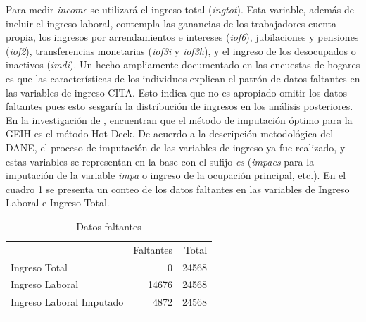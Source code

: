 \documentclass[11pt,a4paper]{article}
\begin{document}
Para medir \emph{income} se utilizará el ingreso total (\textit{ingtot}). Esta variable, además de incluir el ingreso laboral, contempla las ganancias de los trabajadores cuenta propia, los ingresos por arrendamientos e intereses (\textit{iof6}), jubilaciones y pensiones (\textit{iof2}), 
transferencias monetarias (\textit{iof3i} y \textit{iof3h}), y el ingreso de los desocupados o inactivos (\textit{imdi}). 
Un hecho ampliamente documentado en las encuestas de hogares es que las características de los individuos explican el patrón de datos faltantes en las variables de ingreso CITA. Esto indica que no es apropiado omitir los datos faltantes pues esto sesgaría la distribución
de ingresos en los análisis posteriores. En la investigación de \cite{imputacionGEIH}, encuentran que el método de imputación óptimo para la GEIH es el método Hot Deck. De acuerdo a la descripción metodológica del DANE, el proceso de imputación de las variables de ingreso ya fue realizado, y estas variables
se representan en la base con el sufijo \emph{es} (\textit{impaes} para la imputación de la variable \textit{impa} o ingreso de la ocupación principal, etc.). En el cuadro \ref{tbl:DatosFaltantes} se presenta un conteo de los datos faltantes en las variables de Ingreso Laboral e Ingreso Total.


\begin{table}[H]
  \centering
  \caption{Datos faltantes} 
  \label{tab:missing}
  \begingroup\fontsize{9pt}{10pt}\selectfont
  \begin{tabular}{lrr}
    \hline
  \addlinespace
    & Faltantes & Total \\
  \addlinespace
   \hline
   Ingreso Total &   0 & 24568 \\ 
    Ingreso Laboral & 14676 & 24568 \\ 
    Ingreso Laboral Imputado & 4872 & 24568 \\ 
     \addlinespace
  \hline
  \addlinespace
  \end{tabular}
  \endgroup
  \label{tbl:DatosFaltantes}
  \end{table}
  
\end{document}
